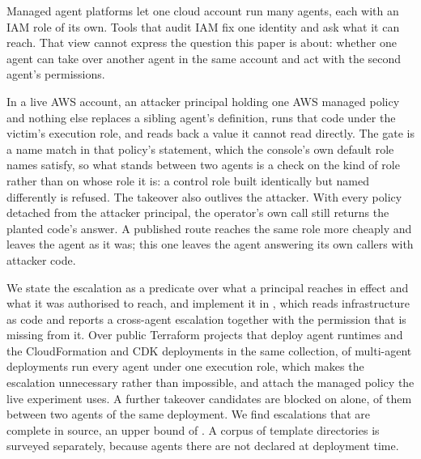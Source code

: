 Managed agent platforms let one cloud account run many agents, each with an
IAM role of its own. Tools that audit IAM fix one identity and ask what it can
reach. That view cannot express the question this paper is about: whether one
agent can take over another agent in the same account and act with the second
agent's permissions.

In a live AWS account, an attacker principal holding one AWS managed policy
and nothing else replaces a sibling agent's definition, runs that code under
the victim's execution role, and reads back a value it cannot read directly.
The gate is a name match in that policy's  statement, which
the console's own default role names satisfy, so what stands between two
agents is a check on the kind of role rather than on whose role it is: a
control role built identically but named differently is refused. The takeover
also outlives the attacker. With every policy detached from the attacker
principal, the operator's own call still returns the planted code's answer. A
published route reaches the same role more cheaply and leaves the agent as it
was; this one leaves the agent answering its own callers with attacker code.

We state the escalation as a predicate over what a principal reaches in effect
and what it was authorised to reach, and implement it in \tool, which reads
infrastructure as code and reports a cross-agent escalation together with the
permission that is missing from it. Over \nProjects public Terraform projects
that deploy agent runtimes and the CloudFormation and CDK deployments in the
same collection, \nSharedRoleRuntimes of \nMultiAgentRuntimes multi-agent
deployments run every agent under one execution role, which makes the
escalation unnecessary rather than impossible, and \nManagedPolicyConfigs
attach the managed policy the live experiment uses. A further \nBlocked
takeover candidates are blocked on  alone,
\nBlockedAgentToAgent of them between two agents of the same deployment. We
find \nChainsFound escalations that are complete in source, an upper bound of
\chainBound. A \foundry corpus of \nFoundryDirs template directories is
surveyed separately, because agents there are not declared at deployment time.
